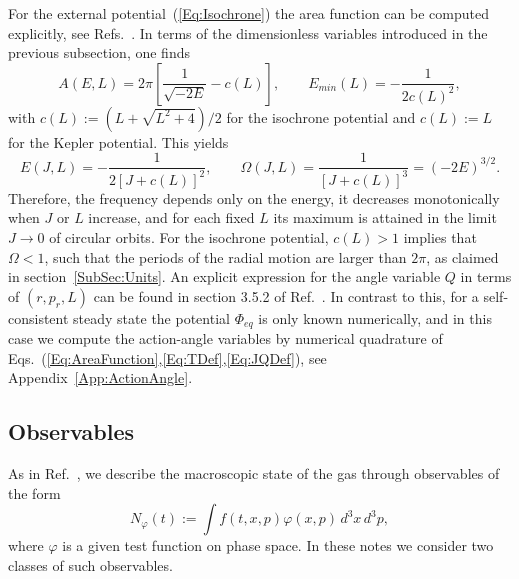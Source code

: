 For the external potential~(\ref{Eq:Isochrone}) the area function can be computed explicitly, see Refs.~\cite{BinneyTremaine-Book,pRoS20}. In terms of the dimensionless variables introduced in the previous subsection, one finds
\begin{equation}
A(E,L) = 2\pi\left[ \frac{1}{\sqrt{-2E}} - c(L) \right],\qquad
E_{min}(L) = -\frac{1}{2c(L)^2},
\label{Eq:AreaIsochrone}
\end{equation}
with $c(L) := \left( L + \sqrt{L^2 + 4} \right)/2$ for the isochrone potential and $c(L) := L$ for the Kepler potential. This yields
\begin{equation}
E(J,L) = -\frac{1}{2\left[ J + c(L) \right]^2},\qquad
\Omega(J,L) = \frac{1}{\left[ J + c(L) \right]^3} = (-2E)^{3/2}.
\label{Eq:OmegaIsochrone}
\end{equation}
Therefore, the frequency depends only on the energy, it decreases monotonically when $J$ or $L$ increase, and for each fixed $L$ its maximum is attained in the limit $J\to 0$ of circular orbits. For the isochrone potential, $c(L) > 1$ implies that $\Omega < 1$, such that the periods of the radial motion are larger than $2\pi$, as claimed in section~\ref{SubSec:Units}. An explicit expression for the angle variable $Q$ in terms of $(r,p_r,L)$ can be found in section 3.5.2 of Ref.~\cite{BinneyTremaine-Book}. In contrast to this, for a self-consistent steady state the potential $\Phi_{eq}$ is only known numerically, and in this case we compute the action-angle variables by numerical quadrature of Eqs.~(\ref{Eq:AreaFunction},\ref{Eq:TDef},\ref{Eq:JQDef}), see Appendix~\ref{App:ActionAngle}.


\subsection{Observables}
\label{SubSec:Observables}

As in Ref.~\cite{pRoS20}, we describe the macroscopic state of the gas through observables of the form
\begin{equation}
N_\varphi(t) := \int f(t,x,p)\varphi(x,p)\, d^3 x\, d^3 p,
\label{Eq:Observable}
\end{equation}
where $\varphi$ is a given test function on phase space. In these notes we consider two classes of such observables.

